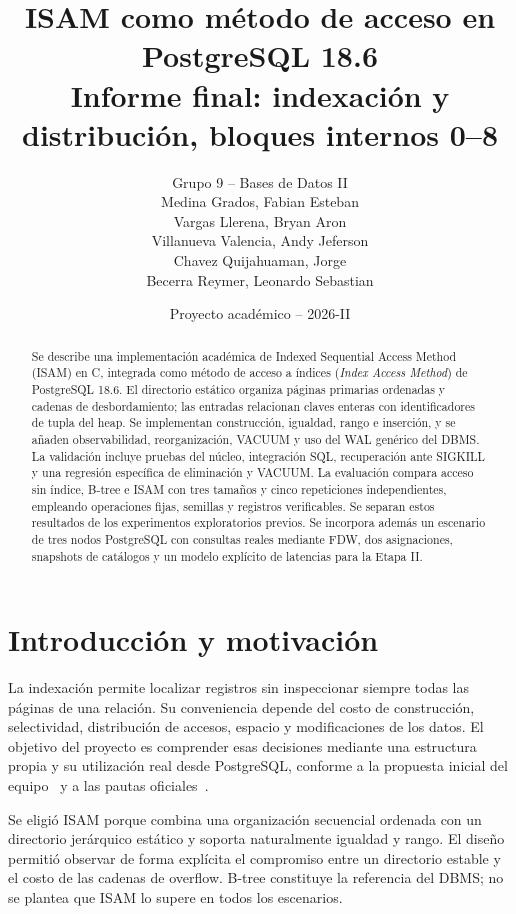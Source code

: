 \documentclass[11pt,a4paper]{article}
\title{ISAM como método de acceso en PostgreSQL 18.6\\
\large Informe final: indexación y distribución, bloques internos 0--8}
\author{Grupo 9 -- Bases de Datos II\\[5pt]
\small Medina Grados, Fabian Esteban\\
\small Vargas Llerena, Bryan Aron\\
\small Villanueva Valencia, Andy Jeferson\\
\small Chavez Quijahuaman, Jorge\\
\small Becerra Reymer, Leonardo Sebastian}
\date{Proyecto académico -- 2026-II}
\begin{document}
\maketitle

{}
\begin{abstract}
Se describe una implementación académica de Indexed Sequential Access Method
(ISAM) en C, integrada como método de acceso a índices
(\textit{Index Access Method}) de PostgreSQL 18.6. El directorio estático
organiza páginas primarias ordenadas y cadenas de desbordamiento; las
entradas relacionan claves enteras con identificadores de tupla del heap. Se
implementan construcción, igualdad, rango e inserción, y se añaden observabilidad,
reorganización, VACUUM y uso del WAL genérico del DBMS. La validación incluye
pruebas del núcleo, integración SQL, recuperación ante SIGKILL y una regresión
específica de eliminación y VACUUM. La evaluación compara acceso sin índice,
B-tree e ISAM con tres tamaños y cinco repeticiones independientes, empleando
operaciones fijas, semillas y registros verificables. Se separan estos resultados
de los experimentos exploratorios previos. Se incorpora además un escenario
de tres nodos PostgreSQL con consultas reales mediante FDW, dos asignaciones,
snapshots de catálogos y un modelo explícito de latencias para la Etapa II.
\end{abstract}

\tableofcontents
\newpage

\section{Introducción y motivación}

La indexación permite localizar registros sin inspeccionar siempre todas las
páginas de una relación. Su conveniencia depende del costo de construcción,
selectividad, distribución de accesos, espacio y modificaciones de los datos.
El objetivo del proyecto es comprender esas decisiones mediante una estructura
propia y su utilización real desde PostgreSQL, conforme a la propuesta inicial
del equipo~\cite{propuesta} y a las pautas oficiales~\cite{rubrica}.

Se eligió ISAM porque combina una organización secuencial ordenada con un
directorio jerárquico estático y soporta naturalmente igualdad y rango. El diseño
permitió observar de forma explícita el compromiso entre un directorio estable y
el costo de las cadenas de overflow. B-tree constituye la referencia del DBMS;
no se plantea que ISAM lo supere en todos los escenarios.
\end{document}
